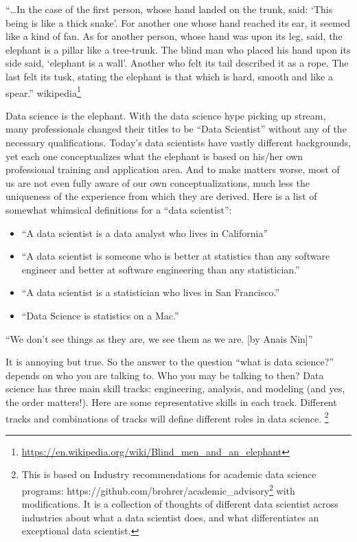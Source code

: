 \documentclass[12pt,]{krantz}
\providecommand{\tightlist}{%
  \setlength{\itemsep}{0pt}\setlength{\parskip}{0pt}}
\renewenvironment{quote}{\begin{VF}}{\end{VF}}
\renewcommand{\href}[2]{#2\footnote{\url{#1}}}
\theoremstyle{definition}
\theoremstyle{definition}
\theoremstyle{definition}
\theoremstyle{remark}
\begin{document}
\begin{quote}
``\ldots{}In the case of the first person, whose hand landed on the
trunk, said: `This being is like a thick snake'. For another one whose
hand reached its ear, it seemed like a kind of fan. As for another
person, whose hand was upon its leg, said, the elephant is a pillar like
a tree-trunk. The blind man who placed his hand upon its side said,
`elephant is a wall'. Another who felt its tail described it as a rope.
The last felt its tusk, stating the elephant is that which is hard,
smooth and like a spear.''
\href{https://en.wikipedia.org/wiki/Blind_men_and_an_elephant}{wikipedia}
\end{quote}

Data science is the elephant. With the data science hype picking up
stream, many professionals changed their titles to be ``Data Scientist''
without any of the necessary qualifications. Today's data scientists
have vastly different backgrounds, yet each one conceptualizes what the
elephant is based on his/her own professional training and application
area. And to make matters worse, most of us are not even fully aware of
our own conceptualizations, much less the uniqueness of the experience
from which they are derived. Here is a list of somewhat whimsical
definitions for a ``data scientist'':

\begin{itemize}
\tightlist
\item
  ``A data scientist is a data analyst who lives in California''
\item
  ``A data scientist is someone who is better at statistics than any
  software engineer and better at software engineering than any
  statistician.''
\item
  ``A data scientist is a statistician who lives in San Francisco.''
\item
  ``Data Science is statistics on a Mac.''
\end{itemize}

\begin{quote}
``We don't see things as they are, we see them as we are. {[}by Anais
Nin{]}''
\end{quote}

It is annoying but true. So the answer to the question ``what is data
science?'' depends on who you are talking to. Who you may be talking to
then? Data science has three main skill tracks: engineering, analysis,
and modeling (and yes, the order matters!). Here are some representative
skills in each track. Different tracks and combinations of tracks will
define different roles in data science. \footnote{This is based on
  \href{https://github.com/brohrer/academic_advisory}{Industry
  recommendations for academic data science programs:
  https://github.com/brohrer/academic\_advisory} with modifications. It
  is a collection of thoughts of different data scientist across
  industries about what a data scientist does, and what differentiates
  an exceptional data scientist.}
\end{document}
